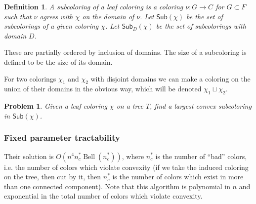\documentclass{amsart}
\newcommand{\col}{\chi}
\newcommand{\subcolS}{\mathsf{Sub}}
\newcommand{\Bell}{\operatorname{Bell}}
\newcommand{\nbadcolors}{n_c^*}
\newtheorem{prop}{Proposition}
\newtheorem{problem}{Problem}
\newtheorem{defn}{Definition}
\begin{document}
\begin{defn}
  A subcoloring of a leaf coloring is a coloring $\nu: G \rightarrow C$ for $G \subset F$ such that $\nu$ agrees with $\col$ on the domain of $\nu$.
  Let $\subcolS(\col)$ be the set of subcolorings of a given coloring $\col$.
  Let $\subcolS_D(\col)$ be the set of subcolorings with domain $D$.
\end{defn}
These are partially ordered by inclusion of domains.
The size of a subcoloring is defined to be the size of its domain.

For two colorings $\col_1$ and $\col_2$ with disjoint domains we can make a coloring on the union of their domains in the obvious way, which will be denoted $\col_1 \sqcup \col_2$.

\begin{problem}
\label{prob:subcolor}
  Given a leaf coloring $\col$ on a tree $T$, find a largest convex subcoloring in $\subcolS(\col)$.
\end{problem}

%
%

\subsubsection{Fixed parameter tractability}
Their solution is $O(n^4 \nbadcolors \Bell(\nbadcolors))$, where $\nbadcolors$ is the number of ``bad'' colors, i.e. the number of colors which violate convexity (if we take the induced coloring on the tree, then cut by it, then $\nbadcolors$ is the number of colors which exist in more than one connected component).
Note that this algorithm is polynomial in $n$ and exponential in the total number of colors which violate convexity.
\end{document}

